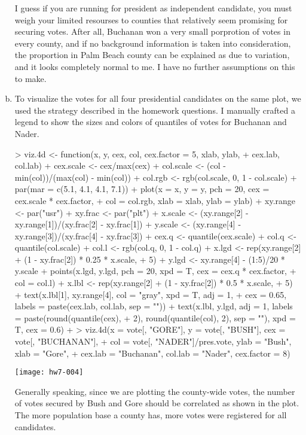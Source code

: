 \documentclass{article}
\begin{document}
\begin{enumerate}[(a)]
    I guess if you are running for president as independent candidate, you must weigh your limited resourses to counties that relatively seem promising for securing votes. After all, Buchanan won a very small porprotion of votes in every county, and if no background information is taken into consideration, the proportion in Palm Beach county can be explained as due to variation, and it looks completely normal to me. I have no further assumptions on this to make.
    \item To visualize the votes for all four presidential candidates on the same plot, we used the strategy described in the homework questions. 
        I manually crafted a legend to show the sizes and colors of quantiles of votes for Buchanan and Nader.
\begin{Schunk}
\begin{Sinput}
> viz.4d <- function(x, y, cex, col, cex.factor = 5, xlab, ylab, 
+     cex.lab, col.lab) {
+     cex.scale <- cex/max(cex)
+     col.scale <- (col - min(col))/(max(col) - min(col))
+     col.rgb <- rgb(col.scale, 0, 1 - col.scale)
+     par(mar = c(5.1, 4.1, 4.1, 7.1))
+     plot(x = x, y = y, pch = 20, cex = cex.scale * cex.factor, 
+         col = col.rgb, xlab = xlab, ylab = ylab)
+     xy.range <- par("usr")
+     xy.frac <- par("plt")
+     x.scale <- (xy.range[2] - xy.range[1])/(xy.frac[2] - xy.frac[1])
+     y.scale <- (xy.range[4] - xy.range[3])/(xy.frac[4] - xy.frac[3])
+     cex.q <- quantile(cex.scale)
+     col.q <- quantile(col.scale)
+     col.l <- rgb(col.q, 0, 1 - col.q)
+     x.lgd <- rep(xy.range[2] + (1 - xy.frac[2]) * 0.25 * x.scale, 
+         5)
+     y.lgd <- xy.range[4] - (1:5)/20 * y.scale
+     points(x.lgd, y.lgd, pch = 20, xpd = T, cex = cex.q * cex.factor, 
+         col = col.l)
+     x.lbl <- rep(xy.range[2] + (1 - xy.frac[2]) * 0.5 * x.scale, 
+         5)
+     text(x.lbl[1], xy.range[4], col = "gray", xpd = T, adj = 1, 
+         cex = 0.65, labels = paste(cex.lab, col.lab, sep = "\n"))
+     text(x.lbl, y.lgd, adj = 1, labels = paste(round(quantile(cex), 
+         2), round(quantile(col), 2), sep = "\n"), xpd = T, cex = 0.6)
+ }
> viz.4d(x = vote[, "GORE"], y = vote[, "BUSH"], cex = vote[, "BUCHANAN"], 
+     col = vote[, "NADER"]/pres.vote, ylab = "Bush", xlab = "Gore", 
+     cex.lab = "Buchanan", col.lab = "Nader", cex.factor = 8)
\end{Sinput}
\end{Schunk}
\texttt{[image: hw7-004]}

    Generally speaking, since we are plotting the county-wide votes, the number of votes secured by Bush and Gore should be correlated as shown in the plot. The more population base a county has, more votes were registered for all candidates.


\end{enumerate}
\end{document}

